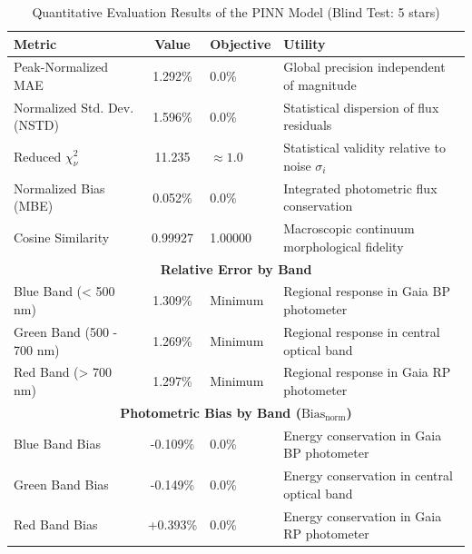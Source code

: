 
\begin{table}[htpb]
\centering
\caption{Quantitative Evaluation Results of the PINN Model (Blind Test: 5 stars)}
\label{tab:pinn_evaluation}
\begin{tabular}{lcll}
\hline
\textbf{Metric} & \textbf{Value} & \textbf{Objective} & \textbf{Utility} \\
\hline
Peak-Normalized MAE & 1.292\% & 0.0\% & Global precision independent of magnitude \\
Normalized Std. Dev. (NSTD) & 1.596\% & 0.0\% & Statistical dispersion of flux residuals \\
Reduced $\chi^2_\nu$ & 11.235 & $\approx 1.0$ & Statistical validity relative to noise $\sigma_i$ \\
Normalized Bias (MBE) & 0.052\% & 0.0\% & Integrated photometric flux conservation \\
Cosine Similarity & 0.99927 & 1.00000 & Macroscopic continuum morphological fidelity \\
\hline
\multicolumn{4}{c}{\textbf{Relative Error by Band}} \\
\hline
Blue Band (< 500 nm) & 1.309\% & Minimum & Regional response in Gaia BP photometer \\
Green Band (500 - 700 nm) & 1.269\% & Minimum & Regional response in central optical band \\
Red Band (> 700 nm) & 1.297\% & Minimum & Regional response in Gaia RP photometer \\
\hline
\multicolumn{4}{c}{\textbf{Photometric Bias by Band ($\text{Bias}_{\text{norm}}$)}} \\
\hline
Blue Band Bias & -0.109\% & 0.0\% & Energy conservation in Gaia BP photometer \\
Green Band Bias & -0.149\% & 0.0\% & Energy conservation in central optical band \\
Red Band Bias & +0.393\% & 0.0\% & Energy conservation in Gaia RP photometer \\
\hline
\end{tabular}
\end{table}
